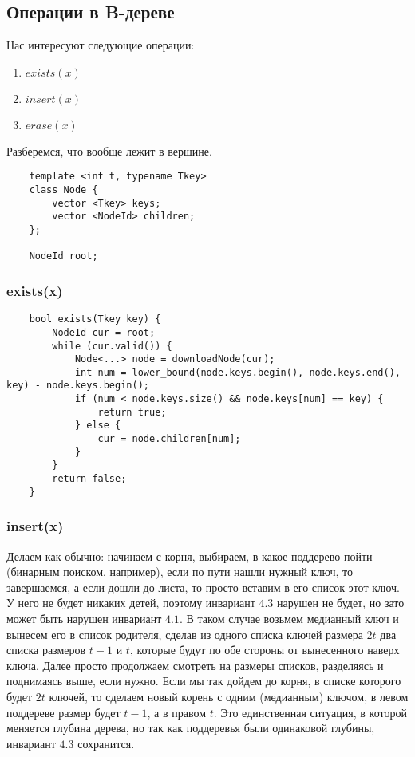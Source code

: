 \subsection{Операции в B-дереве}


Нас интересуют следующие операции:
\begin{enumerate}
    \item $exists(x)$
    \item $insert(x)$
    \item $erase(x)$
\end{enumerate}

Разберемся, что вообще лежит в вершине.

\begin{lstlisting}
    template <int t, typename Tkey>
    class Node {
        vector <Tkey> keys;
        vector <NodeId> children;
    };

    NodeId root;
\end{lstlisting} \pagebreak

\subsubsection{exists(x)}

\begin{lstlisting}
    bool exists(Tkey key) {
        NodeId cur = root;
        while (cur.valid()) {
            Node<...> node = downloadNode(cur);
            int num = lower_bound(node.keys.begin(), node.keys.end(), key) - node.keys.begin();
            if (num < node.keys.size() && node.keys[num] == key) {
                return true;
            } else {
                cur = node.children[num];
            }
        }
        return false;
    }
\end{lstlisting}

\subsubsection{insert(x)}

Делаем как обычно: начинаем с корня, выбираем, в какое поддерево пойти (бинарным поиском, например), если по пути нашли нужный ключ, то завершаемся, а если дошли до листа, то просто вставим в его список этот ключ. У него не будет никаких детей, поэтому инвариант $4.3$ нарушен не будет, но зато может быть нарушен инвариант $4.1$. В таком случае возьмем медианный ключ и вынесем его в список родителя, сделав из одного списка ключей размера $2t$ два списка размеров $t-1$ и $t$, которые будут по обе стороны от вынесенного наверх ключа. Далее просто продолжаем смотреть на размеры списков, разделяясь и поднимаясь выше, если нужно. Если мы так дойдем до корня, в списке которого будет $2t$ ключей, то сделаем новый корень с одним (медианным) ключом, в левом поддереве размер будет $t-1$, а в правом $t$. Это единственная ситуация, в которой меняется глубина дерева, но так как поддеревья были одинаковой глубины, инвариант $4.3$ сохранится.


